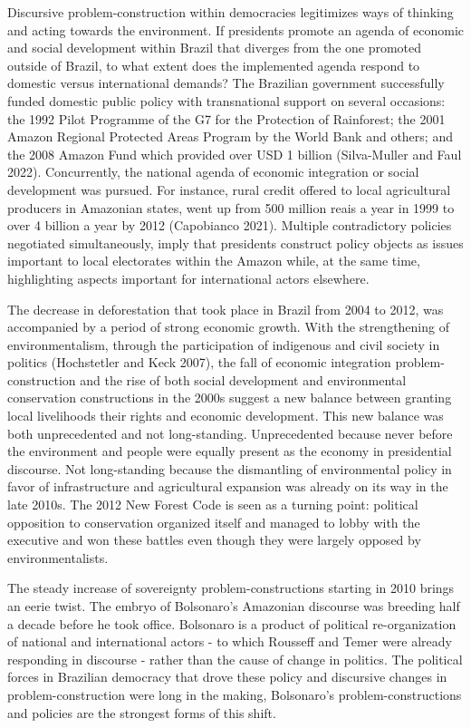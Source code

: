 \documentclass[
  12pt,
]{article}
\begin{document}
Discursive problem-construction within democracies legitimizes ways of
thinking and acting towards the environment. If presidents promote an
agenda of economic and social development within Brazil that diverges
from the one promoted outside of Brazil, to what extent does the
implemented agenda respond to domestic versus international demands? The
Brazilian government successfully funded domestic public policy with
transnational support on several occasions: the 1992 Pilot Programme of
the G7 for the Protection of Rainforest; the 2001 Amazon Regional
Protected Areas Program by the World Bank and others; and the 2008
Amazon Fund which provided over USD 1 billion (Silva-Muller and Faul
2022). Concurrently, the national agenda of economic integration or
social development was pursued. For instance, rural credit offered to
local agricultural producers in Amazonian states, went up from 500
million reais a year in 1999 to over 4 billion a year by 2012
(Capobianco 2021). Multiple contradictory policies negotiated
simultaneously, imply that presidents construct policy objects as issues
important to local electorates within the Amazon while, at the same
time, highlighting aspects important for international actors elsewhere.

The decrease in deforestation that took place in Brazil from 2004 to
2012, was accompanied by a period of strong economic growth. With the
strengthening of environmentalism, through the participation of
indigenous and civil society in politics (Hochstetler and Keck 2007),
the fall of economic integration problem-construction and the rise of
both social development and environmental conservation constructions in
the 2000s suggest a new balance between granting local livelihoods their
rights and economic development. This new balance was both unprecedented
and not long-standing. Unprecedented because never before the
environment and people were equally present as the economy in
presidential discourse. Not long-standing because the dismantling of
environmental policy in favor of infrastructure and agricultural
expansion was already on its way in the late 2010s. The 2012 New Forest
Code is seen as a turning point: political opposition to conservation
organized itself and managed to lobby with the executive and won these
battles even though they were largely opposed by environmentalists.

The steady increase of sovereignty problem-constructions starting in
2010 brings an eerie twist. The embryo of Bolsonaro's Amazonian
discourse was breeding half a decade before he took office. Bolsonaro is
a product of political re-organization of national and international
actors - to which Rousseff and Temer were already responding in
discourse - rather than the cause of change in politics. The political
forces in Brazilian democracy that drove these policy and discursive
changes in problem-construction were long in the making, Bolsonaro's
problem-constructions and policies are the strongest forms of this
shift.
\end{document}
